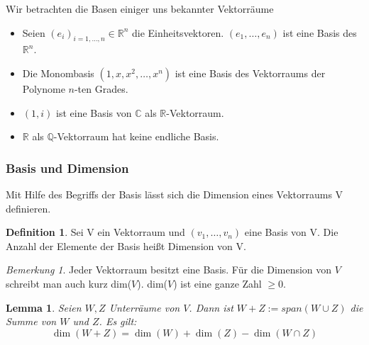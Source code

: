 \documentclass[fontsize=12pt,paper=a4,twoside,bibtotoc,idxtotoc,
liststotoc,pagesize,BCOR1.2cm,DIV15,chapterprefix,pagesize=pdftex]{scrbook}
\theoremstyle{plain}
\newtheorem{lm}[equation]{Lemma}
\theoremstyle{definition}
\newtheorem{df}[equation]{Definition}
\theoremstyle{remark}
\newtheorem{bem}[equation]{Bemerkung}
\begin{document}
Wir betrachten die Basen einiger uns bekannter Vektorräume
\begin{itemize}
\item Seien $(e_i)_{i=1,\ldots,n} \in \mathbb{R}^n$ die Einheitsvektoren. $(e_1, \dots
,e_n)$ ist eine Basis des $\mathbb{R}^n$.
\item Die Monombasis $(1,x,x^2,\dots, x^n)$ ist eine Basis des
Vektorraums der Polynome $n$-ten Grades.
\item $(1,i)$ ist eine Basis von $\mathbb{C}$ als
$\mathbb{R}$-Vektorraum. 
\item $\mathbb{R}$ als $\mathbb{Q}$-Vektorraum hat keine endliche
Basis. 
\end{itemize}
\subsubsection{Basis und Dimension}
Mit Hilfe des Begriffs der Basis lässt sich die Dimension eines Vektorraums V definieren.
\begin{df}
 Sei V ein Vektorraum und $(v_1,\dots, v_n)$ eine Basis von V. Die Anzahl der Elemente der Basis heißt Dimension von V.
\end{df}
\begin{bem}
 Jeder Vektorraum besitzt eine Basis. Für die Dimension von $V$ schreibt man auch kurz dim($V$). dim($V$) ist eine ganze Zahl $\geq0$.
\end{bem}
\begin{lm}
 Seien $W,Z$ Unterräume von $V$. Dann ist $W+Z:=span(W \cup Z)$
die Summe von $W$ und $Z$. Es gilt:
\[ \dim(W+Z)=\dim(W) + \dim (Z) - \dim( W \cap Z) \]
\end{lm}
\end{document}
